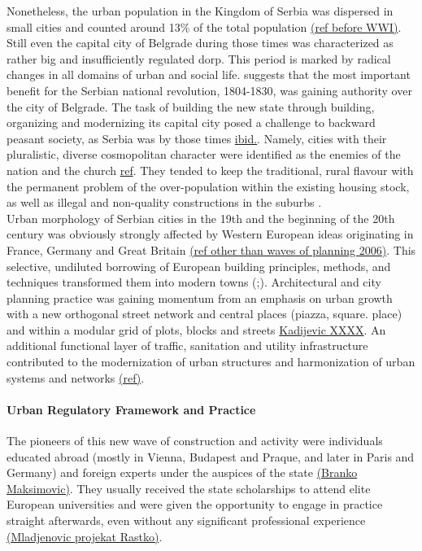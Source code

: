 \documentclass[11pt]{report}
\begin{document}
Nonetheless, the urban population in the Kingdom of Serbia was dispersed in small cities and counted around 13\% of the total population \href{}{(ref before WWI)}. Still even the capital city of Belgrade during those times was characterized as rather big and insufficiently regulated dorp.
This period is marked by radical changes in all domains of urban and social life. 
\href{Samardzic}{\citealt{doytchinov_belgrade_2015}} suggests that the most important benefit for the Serbian national revolution, 1804-1830, was gaining authority over the city of Belgrade. The task of building the new state through building, organizing and modernizing its capital city posed a challenge to backward peasant society, as Serbia was by those times \href{Samardzic}{ibid.}. Namely, cities with their pluralistic, diverse cosmopolitan character were identified as the enemies of the nation and the church \href{}{ref}. They tended to keep the traditional, rural flavour with the permanent problem of the over-population within the existing housing stock, as well as illegal and non-quality constructions in the suburbs \href{}{\citealt{doytchinov_modernization_2015}}.
\\  

Urban morphology of Serbian cities in the 19th and the beginning of the 20th century was obviously strongly affected by Western European ideas originating in France, Germany and Great Britain \href{}{(ref other than waves of planning 2006)}. This selective, undiluted borrowing of European building principles, methods, and techniques transformed them into modern towns (\href{}{\citealt{nedovicbudic_waves_2006}};\href{}{\citealt{ Kadijevic XXXX)}}). Architectural and city planning practice was gaining momentum from an emphasis on urban growth with a new orthogonal street network and central places (piazza, square. place) and within a modular grid of plots, blocks and streets \href{}{Kadijevic XXXX}. An additional functional layer of traffic, sanitation and utility infrastructure contributed to the modernization of urban structures and harmonization of urban systems and networks \href{}{(ref)}.

\paragraph{Urban Regulatory Framework and Practice}

The pioneers of this new wave of construction and activity were individuals educated abroad (mostly in Vienna, Budapest and Praque, and later in Paris and Germany) and foreign experts under the auspices of the state \href{}{(Branko Maksimovic)}. They usually received the state scholarships to attend elite European universities and were given the opportunity to engage in practice straight afterwards, even without any significant professional experience \href{}{(Mladjenovic projekat Rastko)}.
\\
\end{document}
